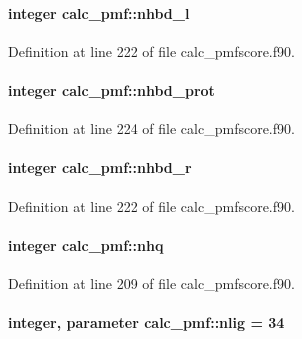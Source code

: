 \hypertarget{classcalc__pmf_a1b095aceba95c04282323155ee1427af}{
\paragraph[{nhbd\-\_\-l}]{\setlength{\rightskip}{0pt plus 5cm}integer calc\-\_\-pmf\-::nhbd\-\_\-l}}\label{classcalc__pmf_a1b095aceba95c04282323155ee1427af}


Definition at line 222 of file calc\-\_\-pmfscore.\-f90.

\hypertarget{classcalc__pmf_ac47b0e97a6432e5234f23c7d671f441d}{
\paragraph[{nhbd\-\_\-prot}]{\setlength{\rightskip}{0pt plus 5cm}integer calc\-\_\-pmf\-::nhbd\-\_\-prot}}\label{classcalc__pmf_ac47b0e97a6432e5234f23c7d671f441d}


Definition at line 224 of file calc\-\_\-pmfscore.\-f90.

\hypertarget{classcalc__pmf_a4e0857a9a7cfd76db79d0a6bd99aa69a}{
\paragraph[{nhbd\-\_\-r}]{\setlength{\rightskip}{0pt plus 5cm}integer calc\-\_\-pmf\-::nhbd\-\_\-r}}\label{classcalc__pmf_a4e0857a9a7cfd76db79d0a6bd99aa69a}


Definition at line 222 of file calc\-\_\-pmfscore.\-f90.

\hypertarget{classcalc__pmf_ab95df575df3eab3d788f4761abf090e5}{
\paragraph[{nhq}]{\setlength{\rightskip}{0pt plus 5cm}integer calc\-\_\-pmf\-::nhq}}\label{classcalc__pmf_ab95df575df3eab3d788f4761abf090e5}


Definition at line 209 of file calc\-\_\-pmfscore.\-f90.

\hypertarget{classcalc__pmf_a42d85dcb1905a89a8601514bd24a120a}{
\paragraph[{nlig}]{\setlength{\rightskip}{0pt plus 5cm}integer, parameter calc\-\_\-pmf\-::nlig = 34}}\label{classcalc__pmf_a42d85dcb1905a89a8601514bd24a120a}


